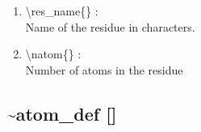 \documentclass[12pt,titlepage]{article}
\begin{document}
\begin{enumerate}

 \vspace{0.15in} 
 \item  \textbackslash res\_name\{\} : \\ 
   Name of the residue in characters.

 \vspace{0.15in} 
 \item  \textbackslash natom\{\} : \\ 
   Number of atoms in the residue
\end{enumerate}

\newpage
\subsection*{\bf \~{ }atom\_def []} 
\end{document}
